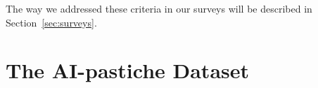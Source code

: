 \documentclass[sn-mathphys]{sn-jnl}
\begin{document}
The way we addressed these criteria in our surveys will be 
described in Section~\ref{sec:surveys}.



\section{The AI-pastiche Dataset}
\label{sec:dataset}




\end{document}
